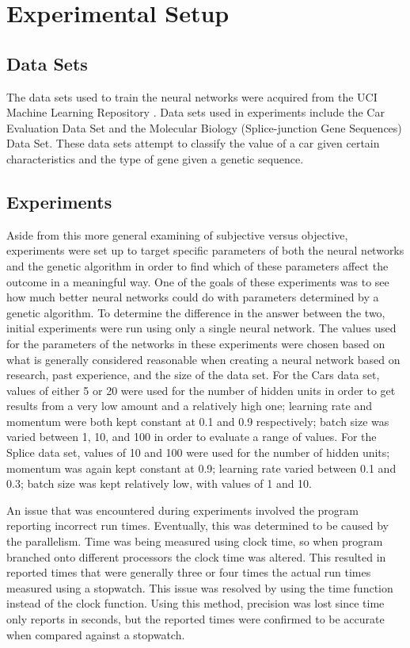 \documentclass[10pt, conference, compsocconf]{IEEEtran}
\begin{document}
\section{Experimental Setup}
\subsection{Data Sets}
The data sets used to train the neural networks were acquired from the UCI Machine Learning Repository \cite{Bache}. Data sets used in experiments include the Car Evaluation Data Set and the Molecular Biology (Splice-junction Gene Sequences) Data Set. These data sets attempt to classify the value of a car given certain characteristics and the type of gene given a genetic sequence.

\subsection{Experiments}
Aside from this more general examining of subjective versus objective, experiments were set up to target specific parameters of both the neural networks and the genetic algorithm in order to find which of these parameters affect the outcome in a meaningful way. One of the goals of these experiments was to see how much better neural networks could do with parameters determined by a genetic algorithm. To determine the difference in the answer between the two, initial experiments were run using only a single neural network. The values used for the parameters of the networks in these experiments were chosen based on what is generally considered reasonable when creating a neural network based on research, past experience, and the size of the data set. For the Cars data set, values of either 5 or 20 were used for the number of hidden units in order to get results from a very low amount and a relatively high one; learning rate and momentum were both kept constant at 0.1 and 0.9 respectively; batch size was varied between 1, 10, and 100 in order to evaluate a range of values. For the Splice data set, values of 10 and 100 were used for the number of hidden units; momentum was again kept constant at 0.9; learning rate varied between 0.1 and 0.3; batch size was kept relatively low, with values of 1 and 10.

An issue that was encountered during experiments involved the program reporting incorrect run times. Eventually, this was determined to be caused by the parallelism. Time was being measured using clock time, so when program branched onto different processors the clock time was altered. This resulted in reported times that were generally three or four times the actual run times measured using a stopwatch. This issue was resolved by using the time function instead of the clock function. Using this method, precision was lost since time only reports in seconds, but the reported times were confirmed to be accurate when compared against a stopwatch.
\end{document}
